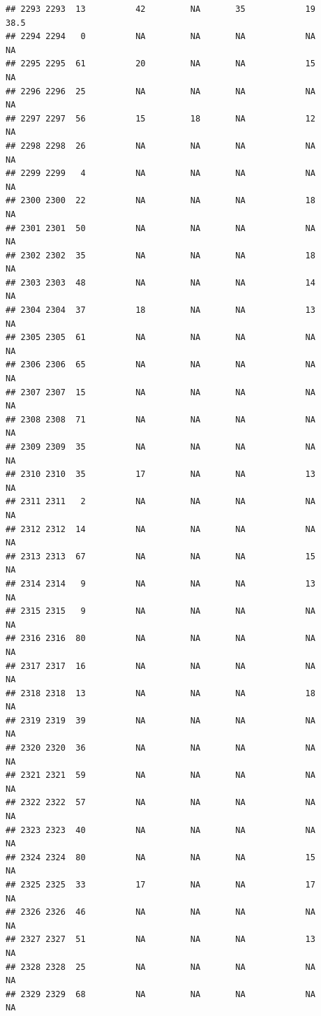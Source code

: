 \documentclass[man]{apa6}
\begin{document}
\begin{verbatim}
## 2293 2293  13          42         NA       35            19     38.5
## 2294 2294   0          NA         NA       NA            NA       NA
## 2295 2295  61          20         NA       NA            15       NA
## 2296 2296  25          NA         NA       NA            NA       NA
## 2297 2297  56          15         18       NA            12       NA
## 2298 2298  26          NA         NA       NA            NA       NA
## 2299 2299   4          NA         NA       NA            NA       NA
## 2300 2300  22          NA         NA       NA            18       NA
## 2301 2301  50          NA         NA       NA            NA       NA
## 2302 2302  35          NA         NA       NA            18       NA
## 2303 2303  48          NA         NA       NA            14       NA
## 2304 2304  37          18         NA       NA            13       NA
## 2305 2305  61          NA         NA       NA            NA       NA
## 2306 2306  65          NA         NA       NA            NA       NA
## 2307 2307  15          NA         NA       NA            NA       NA
## 2308 2308  71          NA         NA       NA            NA       NA
## 2309 2309  35          NA         NA       NA            NA       NA
## 2310 2310  35          17         NA       NA            13       NA
## 2311 2311   2          NA         NA       NA            NA       NA
## 2312 2312  14          NA         NA       NA            NA       NA
## 2313 2313  67          NA         NA       NA            15       NA
## 2314 2314   9          NA         NA       NA            13       NA
## 2315 2315   9          NA         NA       NA            NA       NA
## 2316 2316  80          NA         NA       NA            NA       NA
## 2317 2317  16          NA         NA       NA            NA       NA
## 2318 2318  13          NA         NA       NA            18       NA
## 2319 2319  39          NA         NA       NA            NA       NA
## 2320 2320  36          NA         NA       NA            NA       NA
## 2321 2321  59          NA         NA       NA            NA       NA
## 2322 2322  57          NA         NA       NA            NA       NA
## 2323 2323  40          NA         NA       NA            NA       NA
## 2324 2324  80          NA         NA       NA            15       NA
## 2325 2325  33          17         NA       NA            17       NA
## 2326 2326  46          NA         NA       NA            NA       NA
## 2327 2327  51          NA         NA       NA            13       NA
## 2328 2328  25          NA         NA       NA            NA       NA
## 2329 2329  68          NA         NA       NA            NA       NA

\end{verbatim}
\end{document}
